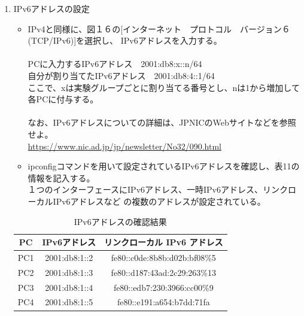 \documentclass[10pt]{article}
\begin{document}
\begin{enumerate}
    \item IPv6アドレスの設定
        \begin{itemize}
            \item IPv4と同様に、図１６の[インターネット　プロトコル　バージョン６(TCP/IPv6)]を選択し、
                IPv6アドレスを入力する。\\\\
                PCに入力するIPv6アドレス　2001:db8:x::n/64 \\
                自分が割り当てたIPv6アドレス　2001:db8:4::1/64 \\
                \text{*}ここで、xは実験グループごとに割り当てる番号とし、nは1から増加して各PCに付与する。\\\\
                なお、IPv6アドレスについての詳細は、JPNICのWebサイトなどを参照せよ。\\
                \underline{https://www.nic.ad.jp/jp/newsletter/No32/090.html}
            \item ipconfigコマンドを用いて設定されているIPv6アドレスを確認し、表11の情報を記入する。 \\
                １つのインターフェースにIPv6アドレス、一時IPv6アドレス、リンクローカルIPv6アドレスなど
                の複数のアドレスが設定されている。 
        \end{itemize}
                \begingroup
                \setlength{\tabcolsep}{5pt} %
                \renewcommand{\arraystretch}{1.5} %
                    \begin{table}[H]
                    \centering
                	\caption{IPv6アドレスの確認結果 }
                	\begin{tabular}{|c|c|c|}
                	    \hline
                	    PC & IPv6アドレス & リンクローカル IPv6 アドレス \\[0.5ex]
                		\hline\hline
                    	PC1 & 2001:db8:1::2 & fe80::c0de:8b8b:d02b:bf08\%5 \\ \hline
                    	PC2 & 2001:db8:1::3 & fe80::d187:43ad:2c29:263\%13 \\ \hline
                    	PC3 & 2001:db8:1::4 & fe80::edb7:230:3966:cc00\%9 \\ \hline
                    	PC4 & 2001:db8:1::5 & fe80::e191:a654:b7dd:71fa \\ \hline
                	\end{tabular}

\end{table}
\end{enumerate}
\end{document}
